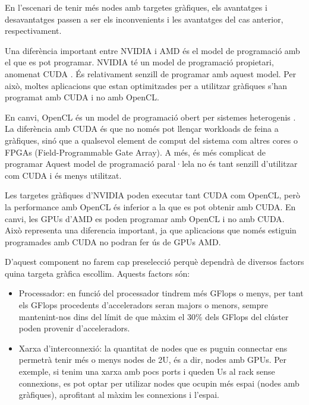 En l'escenari de tenir més nodes amb targetes gràfiques, els avantatges i desavantatges passen a ser els inconvenients i les avantatges del cas anterior, respectivament.

Una diferència important entre NVIDIA i AMD és el model de programació amb el que es pot programar. 
NVIDIA té un model de programació propietari, anomenat CUDA \cite{gpu_cuda}. És relativament senzill de programar amb aquest model. Per això, moltes aplicacions que estan optimitzades per a utilitzar gràfiques s'han programat amb CUDA i no amb OpenCL.

En canvi, OpenCL és un model de programació obert per sistemes heterogenis \cite{gpu_opencl}. La diferència amb CUDA és que no només pot llençar workloads de feina a gràfiques, sinó que a qualsevol element de comput del sistema com altres cores o FPGAs (Field-Programmable Gate Array). A més, és més complicat de programar
Aquest model de programació paral·lela no és tant senzill d'utilitzar com CUDA i és menys utilitzat.

Les targetes gràfiques d'NVIDIA poden executar tant CUDA com OpenCL, però la performance amb OpenCL és inferior a la que es pot obtenir amb CUDA. En canvi, les GPUs d'AMD es poden programar amb OpenCL i no amb CUDA. 
Això representa una diferencia important, ja que aplicacions que només estiguin programades amb CUDA no podran fer ús de GPUs AMD.

D'aquest component no farem cap preselecció perquè dependrà de diversos factors quina targeta gràfica escollim. Aquests factors són: 
\begin{itemize}
    \item Processador: en funció del processador tindrem més GFlops o menys, per tant els GFlops procedents d'acceleradors seran majors o menors, sempre mantenint-nos dins del límit de que màxim el 30\% dels GFlops del clúster poden provenir d'acceleradors.
    \item Xarxa d'interconnexió: la quantitat de nodes que es puguin connectar ens permetrà tenir més o menys nodes de 2U, és a dir, nodes amb GPUs. Per exemple, si tenim una xarxa amb pocs ports i queden Us al rack sense connexions, es pot optar per utilizar nodes que ocupin més espai (nodes amb gràfiques), aprofitant al màxim les connexions i l'espai.
\end{itemize}


